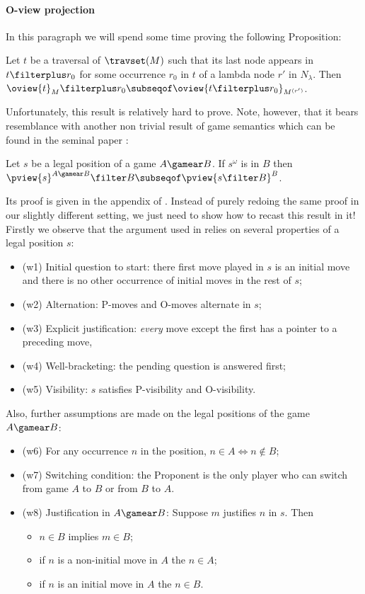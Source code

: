 \paragraph{O-view projection}
In this paragraph we will spend some time proving the following Proposition:
\begin{proposition}
\label{prop:oview_trav_projection}
   Let $t$ be a traversal of $\travset(M)$ such that its last node
   appears in $t \filterplus r_0$ for some occurrence $r_0$ in $t$ of a lambda node $r'$ in $N_\lambda$.
   Then $ \oview{t}_M\filterplus r_0 \subseqof \oview{t\filterplus r_0}_{M^{(r')}}$.
\end{proposition}
Unfortunately, this result is relatively hard to prove. Note, however, that it bears resemblance with another
non trivial result of game semantics which can be found in the seminal paper \cite{hylandong_pcf}:
\begin{proposition}{\cite[Prop.4.3]{hylandong_pcf}}
\label{prop:hylandong_pviewprojection}
  Let $s$ be a legal position of a game $A\gamear B$.
  If $s^\omega$ is in $B$ then $\pview{s}^{A\gamear B} \filter B \subseqof \pview{s\filter B}^B$.
\end{proposition}
Its proof is given in the appendix of \cite{hylandong_pcf}. Instead of purely redoing the same proof in our slightly different setting,
we just need to show how to recast this result in it! Firstly we observe that the
argument used in \cite{hylandong_pcf} relies on several properties of a legal position $s$:
\begin{itemize}
  \item (w1) Initial question to start: there first move played in $s$ is an initial move and there is no other occurrence of initial moves in the rest of $s$;
  \item(w2) Alternation: P-moves and O-moves alternate in $s$;
  \item(w3)  Explicit justification: \emph{every} move except the first has a pointer to a preceding move,
  \item(w4)  Well-bracketing: the pending question is answered first;
  \item(w5)  Visibility: $s$ satisfies P-visibility and
O-visibility.
\end{itemize}
Also, further assumptions are made on the legal positions of the game
$A\gamear B$:
\begin{itemize}
  \item(w6) For any occurrence $n$ in the position, $n \in A \iff n \not\in
B$;
  \item(w7) Switching condition: the Proponent is the only player
      who can switch from game $A$ to $B$ or from $B$ to $A$.
  \item(w8) Justification in $A\gamear B$: Suppose $m$ justifies $n$ in $s$. Then
    \begin{itemize}
        \item $n \in B$ implies $m\in B$;
        \item if $n$ is a non-initial move in $A$ the $n \in A$;
        \item if $n$ is an initial move in $A$ the $n \in B$.
    \end{itemize}
\end{itemize}
